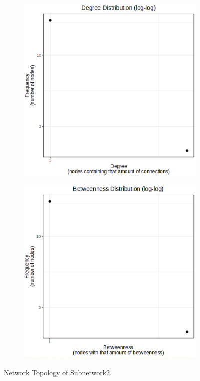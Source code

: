 \begin{figure}[H]
    \centering
    \begin{subfigure}[t]{0.48\textwidth}
        \centering
        \includegraphics[width=\textwidth]{./fig/fig4_13_1.png}
        \label{fig:subnetwork1}
    \end{subfigure}
    \hfill
    \begin{subfigure}[t]{0.48\textwidth}
        \centering
        \includegraphics[width=\textwidth]{./fig/fig4_13_2.png}
        \label{fig:subnetwork2}
    \end{subfigure}
    \caption{Network Topology of Subnetwork2. }
    \label{fig:figure4-13}
\end{figure}

